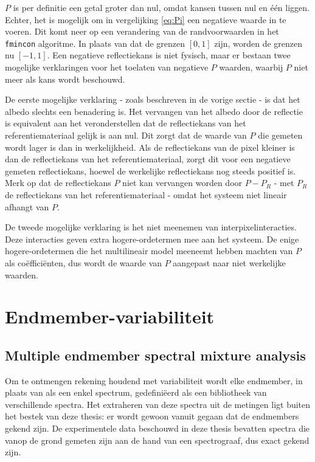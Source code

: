 \documentclass[12pt]{report}
\begin{document}
$P$ is per definitie een getal groter dan nul, omdat kansen tussen nul en \'e\'en liggen. Echter, het is mogelijk om in vergelijking \ref{eq:Pi} een negatieve waarde in te voeren. Dit komt neer op een verandering van de randvoorwaarden in het \texttt{fmincon} algoritme. In plaats van dat de grenzen $[0,1]$ zijn, worden de grenzen nu $[-1,1]$. 
Een negatieve reflectiekans is niet fysisch, maar er bestaan twee mogelijke verklaringen voor het toelaten van negatieve $P$ waarden, waarbij $P$ niet meer als kans wordt beschouwd.

De eerste mogelijke verklaring - zoals beschreven in de vorige sectie - is dat het albedo slechts een benadering is. Het vervangen van het albedo door de reflectie is equivalent aan het veronderstellen dat de reflectiekans van het referentiemateriaal gelijk is aan nul. Dit zorgt dat de waarde van $P$ die gemeten wordt lager is dan in werkelijkheid. Als de reflectiekans van de pixel kleiner is dan de reflectiekans van het referentiemateriaal, zorgt dit voor een negatieve gemeten reflectiekans, hoewel de werkelijke reflectiekans nog steeds positief is. Merk op dat de reflectiekans $P$ niet kan  vervangen worden door $P-P_{R}$  - met $P_{R}$ de reflectiekans van het referentiemateriaal - omdat het systeem niet lineair afhangt van $P$.

De tweede mogelijke verklaring is het niet meenemen van interpixelinteracties. Deze interacties geven extra hogere-ordetermen mee aan het systeem. De enige hogere-ordetermen die het multilineair model meeneemt hebben machten van $P$ als co\"effici\"enten, dus wordt de waarde van $P$ aangepast naar niet werkelijke waarden.  



\chapter{Endmember-variabiliteit\cite{mesma}} 

\section{Multiple endmember spectral mixture analysis} \label{sec:mesma}

Om te ontmengen rekening houdend met variabiliteit wordt elke endmember, in plaats van als een enkel spectrum, gedefini\"eerd als een bibliotheek van verschillende spectra. Het extraheren van deze spectra uit de metingen ligt buiten het bestek van deze thesis: er wordt gewoon vanuit gegaan dat de endmembers gekend zijn. De experimentele data beschouwd in deze thesis bevatten spectra die vanop de grond gemeten zijn aan de hand van een spectrograaf, dus exact gekend zijn.
\end{document}
